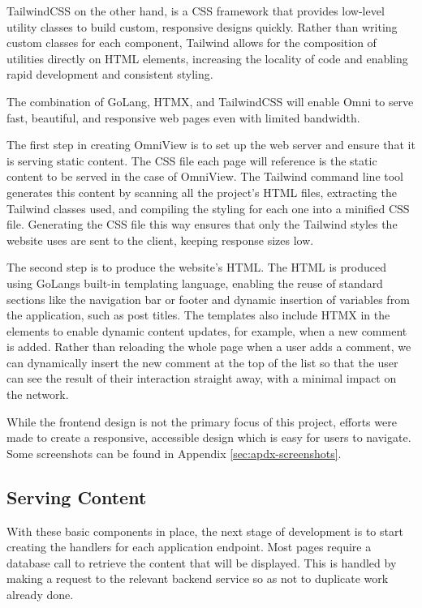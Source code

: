 TailwindCSS on the other hand, is a CSS framework that provides low-level utility classes to build custom, responsive designs quickly.
Rather than writing custom classes for each component, Tailwind allows for the composition of utilities directly on HTML elements, increasing the locality of code and enabling rapid development and consistent styling. 



The combination of GoLang, HTMX, and TailwindCSS will enable Omni to serve fast, beautiful, and responsive web pages even with limited bandwidth. 

The first step in creating OmniView is to set up the web server and ensure that it is serving static content.
The CSS file each page will reference is the static content to be served in the case of OmniView.
The Tailwind command line tool generates this content by scanning all the project's HTML files, extracting the Tailwind classes used, and compiling the styling for each one into a minified CSS file.
Generating the CSS file this way ensures that only the Tailwind styles the website uses are sent to the client, keeping response sizes low.

The second step is to produce the website's HTML.
The HTML is produced using GoLangs built-in templating language, enabling the reuse of standard sections like the navigation bar or footer and dynamic insertion of variables from the application, such as post titles.
The templates also include HTMX in the elements to enable dynamic content updates, for example, when a new comment is added.
Rather than reloading the whole page when a user adds a comment, we can dynamically insert the new comment at the top of the list so that the user can see the result of their interaction straight away, with a minimal impact on the network.

While the frontend design is not the primary focus of this project, efforts were made to create a responsive, accessible design which is easy for users to navigate.
Some screenshots can be found in Appendix \ref{sec:apdx-screenshots}.

\subsection{Serving Content}
With these basic components in place, the next stage of development is to start creating the handlers for each application endpoint.
Most pages require a database call to retrieve the content that will be displayed. This is handled by making a request to the relevant backend service so as not to duplicate work already done. 

